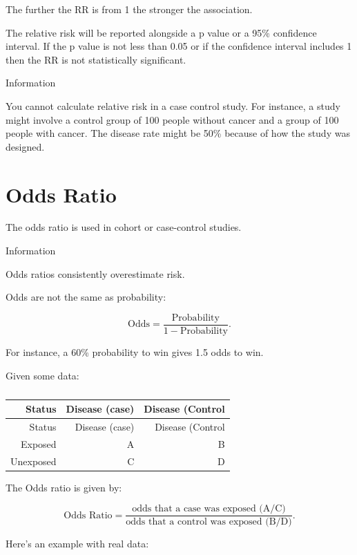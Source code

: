 \documentclass[
]{book}
\begin{document}
The further the RR is from 1 the stronger the association.

The relative risk will be reported alongside a p value or a 95\% confidence interval. If the p value is not less than 0.05 or if the confidence interval includes 1 then the RR is not statistically significant.

Information

You cannot calculate relative risk in a case control study. For instance, a study might involve a control group of 100 people without cancer and a group of 100 people with cancer. The disease rate might be 50\% because of how the study was designed.

\hypertarget{odds-ratio}{%
\section{Odds Ratio}\label{odds-ratio}}

The odds ratio is used in cohort or case-control studies.

Information

Odds ratios consistently overestimate risk.

Odds are not the same as probability:

\[\textrm{Odds}=\frac{\textrm{Probability}}{1-\textrm{Probability}}.\]

For instance, a 60\% probability to win gives 1.5 odds to win.

Given some data:

\begin{longtable}[]{@{}rrr@{}}
\caption{\label{tab:table16}}\tabularnewline
\toprule
Status & Disease (case) & Disease (Control \\
\midrule
\endfirsthead
\toprule
Status & Disease (case) & Disease (Control \\
\midrule
\endhead
Exposed & A & B \\
Unexposed & C & D \\
\bottomrule
\end{longtable}

The Odds ratio is given by:

\[\textrm{Odds Ratio} = \frac{\textrm{odds that a case was exposed (A/C)}}{\textrm{odds that a control was exposed (B/D)}}.\]

Here's an example with real data:
\end{document}
